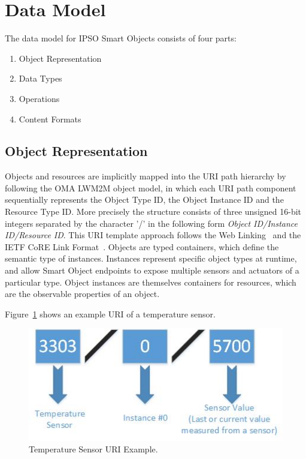 \documentclass[peerreview, a4paper, 7pt]{IEEEtran}
\begin{document}
\section{Data Model} 

The data model for IPSO Smart Objects consists of four parts:

\begin{enumerate}
\item Object Representation
\item Data Types 
\item Operations 
\item Content Formats
\end{enumerate}


\subsection{Object Representation}

Objects and resources are implicitly mapped into the URI path hierarchy by following the OMA LWM2M object model, in which each URI path component sequentially represents the Object Type ID, the Object Instance ID and the Resource Type ID. More precisely the structure consists of three unsigned 16-bit integers separated by the character '/' in the following form \textit{Object ID/Instance ID/Resource ID}. This URI template approach follows the Web Linking~\cite{rfc5988} and the IETF CoRE Link Format~\cite{rfc6690}. 
Objects are typed containers, which define the semantic type of instances. Instances represent specific object types at runtime, and allow Smart Object endpoints to expose multiple sensors and actuators of a particular type. Object instances are themselves containers for resources, which are the observable properties of an object.

Figure~\ref{temperature-uri-figure} shows an example URI of a temperature sensor. 

\begin{figure}[!htbp]
 \centering
 \includegraphics[scale=0.50]{temperature-uri.jpg}
 \caption{Temperature Sensor URI Example.}
 \label{temperature-uri-figure}
\end{figure}
\end{document}
